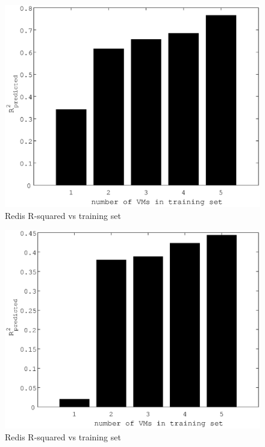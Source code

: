 \documentclass{acm_proc_article-sp}
\begin{document}
\begin{figure}
\centering
\includegraphics[scale = 0.5]{bar_read_avg_latency_r3__r3_x_m3__m3_2x_r3_2x_m3_x.eps}
\caption{Redis R-squared vs training set}
\label{figure:redisbarread}
\end{figure}

\begin{figure}
\centering
\includegraphics[scale = 0.5]{bar_read_avg_latency_r3__r3_2x_m3_2x_m3__m3_x_r3_x.eps}
\caption{Redis R-squared vs training set}
\label{figure:redisbarread}
\end{figure}
\end{document}
